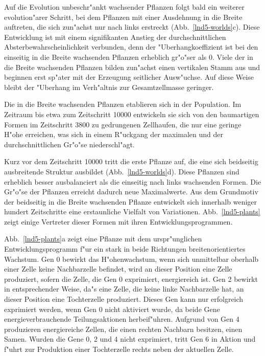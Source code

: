 Auf die Evolution unbeschr"ankt wachsender Pflanzen folgt bald ein weiterer evolution"arer Schritt, bei dem Pflanzen
mit einer Ausdehnung in die Breite auftreten, die sich zun"achst nur nach links erstreckt (Abb.\ \ref{lnd5-worlds}c).
Diese Entwicklung ist mit einem signifikanten Anstieg der durchschnittlichen Absterbewahrscheinlichkeit
verbunden, denn der "Uberhangkoeffizient ist bei den einseitig in die Breite wachsenden Pflanzen erheblich gr"o"ser
als 0. Viele der in die Breite wachsenden Pflanzen bilden zun"achst einen vertikalen Stamm aus und beginnen erst
sp"ater mit der Erzeugung seitlicher Ausw"uchse. Auf diese Weise bleibt der "Uberhang im Verh"altnis zur Gesamtzellmasse
geringer.

Die in die Breite wachsenden Pflanzen etablieren sich in der Population. Im Zeitraum bis etwa zum Zeitschritt 10000
entwickeln sie sich von den baumartigen Formen im Zeitschritt 3800 zu gedrungenen Zellhaufen, die nur eine geringe
H"ohe erreichen, was sich in einem R"uckgang der maximalen und der durchschnittlichen Gr"o"se niederschl"agt.

Kurz vor dem Zeitschritt 10000 tritt die erste Pflanze auf, die eine sich beidseitig ausbreitende Struktur ausbildet
(Abb.\ \ref{lnd5-worlds}d). Diese Pflanzen sind erheblich besser ausbalanciert als die einseitig nach links wachsenden
Formen. Die Gr"o"se der Pflanzen erreicht dadurch neue Maximalwerte. Aus dem Grundmotiv der beidseitig in die Breite
wachsenden Pflanze entwickelt sich innerhalb weniger hundert Zeitschritte eine erstaunliche Vielfalt von Variationen.
Abb.\ \ref{lnd5-plants} zeigt einige Vertreter dieser Formen mit ihren Entwicklungsprogrammen.

Abb.\ \ref{lnd5-plants}a zeigt eine Pflanze mit dem urspr"unglichen Entwicklungsprogramm f"ur ein stark in beide
Richtungen breitenorientiertes Wachstum. Gen 0 bewirkt das H"ohenwachstum, wenn sich unmittelbar oberhalb einer
Zelle keine Nachbarzelle befindet, wird an dieser Position eine Zelle produziert, sofern die Zelle, die Gen 0 exprimiert,
energiereich ist. Gen 2 bewirkt in entsprechender Weise, da"s eine Zelle, die keine linke Nachbarzelle hat, an dieser
Position eine Tochterzelle produziert. Dieses Gen kann nur erfolgreich exprimiert werden, wenn Gen 0 nicht aktiviert
wurde, da beide Gene energieverbrauchende Teilungsaktionen herbeif"uhren. Aufgrund von Gen 4 produzieren energiereiche
Zellen, die einen rechten Nachbarn besitzen, einen Samen. Wurden die Gene 0, 2 und 4 nicht exprimiert, tritt Gen 6
in Aktion und f"uhrt zur Produktion einer Tochterzelle rechts neben der aktuellen Zelle.

